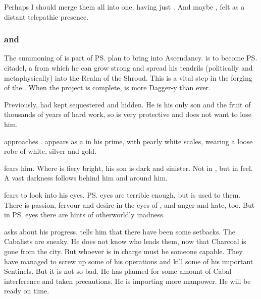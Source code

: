 Perhaps I should merge them all into one, having just \Nzessuacrith.
And maybe \Vizsherioch, felt as a distant telepathic presence. 





\subsubsection[Psyrex and Vizsherioch]{\Psyrex and \Vizsherioch}
%
The summoning of \Nithdornazsh{} is part of \ps{\Secherdamon} plan to bring  into Ascendancy. 
\Nithdornazsh{} is to become \ps{\Vizsherioch} citadel, a \nexus{} from which he can grow strong and spread his tendrils (politically and metaphysically) into the Realm of the Shroud. 
This is a vital step in the forging of the . 
When the \Nithdornazsh{} project is complete, \Vizsherioch{} is more Dagger-y than ever. 

Previously, \Secherdamon{} had kept \Vizsherioch{} sequestered and hidden. 
He is his only son and the fruit of thousands of years of hard work, so \Secherdamon{} is very protective and does not want to lose him. 

\Vizsherioch approaches \LocarPsyrex.
\Vizsherioch appears as a \dax in his prime, with pearly white scales, wearing a loose robe of white, silver and gold. 

\Psyrex fears him. 
Where \Secherdamon is fiery bright, his son \Vizsherioch is dark and sinister. 
Not in \colour, but in feel. 
A vast darkness follows behind him and around him. 

\Psyrex fears to look into his eyes. 
\ps{\Secherdamon} eyes are terrible enough, but \Psyrex is used to them. 
There is passion, fervour and desire in the eyes of \Secherdamon, and anger and hate, too. 
But in \ps{\Vizsherioch} eyes there are hints of otherworldly madness. 

\Vizsherioch asks \Psyrex about his progress. 
\Psyrex tells him that there have been some setbacks. 
The Cabalists are sneaky.
He does not know who leads them, now that Charcoal is gone from the city. 
But whoever is in charge must be someone capable. 
They have managed to screw up some of his operations and kill some of his important Sentinels. 
But it is not so bad. 
He has planned for some amount of Cabal interference and taken precautions. 
He is importing more manpower. 
He will be ready on time. 

